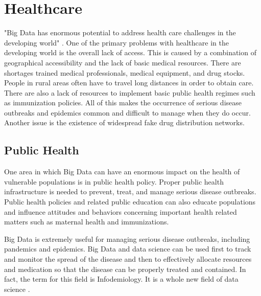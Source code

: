 \documentclass[sigconf]{acmart}
\begin{document}
\section{Healthcare}

"Big Data has enormous potential to address health care challenges in the developing world" \cite{DevEcon}. One of the primary problems with healthcare in the developing world is the overall lack of access. This is caused by a combination of geographical accessibility and the lack of basic medical resources. There are shortages trained medical professionals, medical equipment, and drug stocks. People in rural areas often have to travel long distances in order to obtain care. There are also a lack of resources to implement basic public health regimes such as immunization policies.  All of this makes the occurrence of serious disease outbreaks and epidemics common and difficult to manage when they do occur.  Another issue is the existence of widespread fake drug distribution networks.

\subsection{Public Health}
One area in which Big Data can have an enormous impact on the health of vulnerable populations is in public health policy. Proper public health infrastructure is needed to prevent, treat, and manage serious disease outbreaks. Public health policies and related public education can also educate populations and influence attitudes and behaviors concerning important health related matters such as maternal health and immunizations. 

Big Data is extremely useful for managing serious disease outbreaks, including pandemics and epidemics. Big Data and data science can be used first to track and monitor the spread of the disease and then to effectively allocate resources and medication so that the disease can be properly treated and contained. In fact, the term for this field is Infodemiology. It is a whole new field of data science \cite{www-google-GloPls}.
\end{document}
